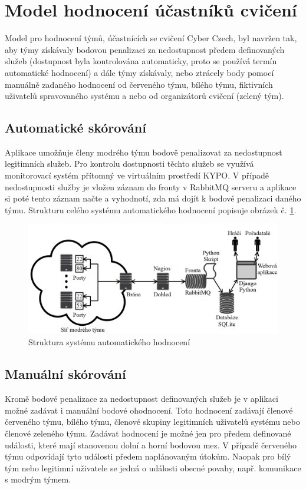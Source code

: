 \documentclass[
  digital,
  twoside,
  table, 
  nolof, 
  nolot
]{fithesis3}
\begin{document}
\section{Model hodnocení účastníků cvičení}
Model pro hodnocení týmů, účastnících se cvičení Cyber Czech, byl navržen tak, aby týmy získávaly bodovou penalizaci za nedostupnost předem definovaných služeb (dostupnost byla kontrolována automaticky, proto se používá termín automatické hodnocení) a dále týmy získávaly, nebo ztrácely body pomocí manuálně zadaného hodnocení od červeného týmu, bílého týmu, fiktivních uživatelů spravovaného systému a nebo od organizátorů cvičení (zelený tým).

\subsection{Automatické skórování}
Aplikace umožňuje členy modrého týmu bodově penalizovat za nedostupnost legitimních služeb. Pro kontrolu dostupnosti těchto služeb se využívá monitorovací systém přítomný ve virtuálním prostředí KYPO. V případě nedostupnosti služby je vložen záznam do fronty v RabbitMQ \cite{rabitmq} serveru a aplikace si poté tento záznam načte a vyhodnotí, zda má dojít k bodové penalizaci daného týmu. Strukturu celého systému automatického hodnocení popisuje obrázek č. \ref{fig:autoScoring}.

\begin{figure}[h!]
    \centering
    \includegraphics[width=13cm]{images/Page-47-Image-27.png}
    \caption{Struktura systému automatického hodnocení \cite{Kostelnik2016thesis}}
    \label{fig:autoScoring}
\end{figure}

\subsection{Manuální skórování}
Kromě bodové penalizace za nedostupnost definovaných služeb je v aplikaci možné zadávat i manuální bodové ohodnocení. Toto hodnocení zadávají členové červeného týmu, bílého týmu, členové skupiny legitimních uživatelů systému nebo členové zeleného týmu. Zadávat hodnocení je možné jen pro předem definované události, které mají stanovenou dolní a horní bodovou mez. V případě červeného týmu odpovídají tyto události předem naplánovaným útokům. Naopak pro bílý tým nebo legitimní uživatele se jedná o události obecné povahy, např. komunikace s modrým týmem.
\end{document}
